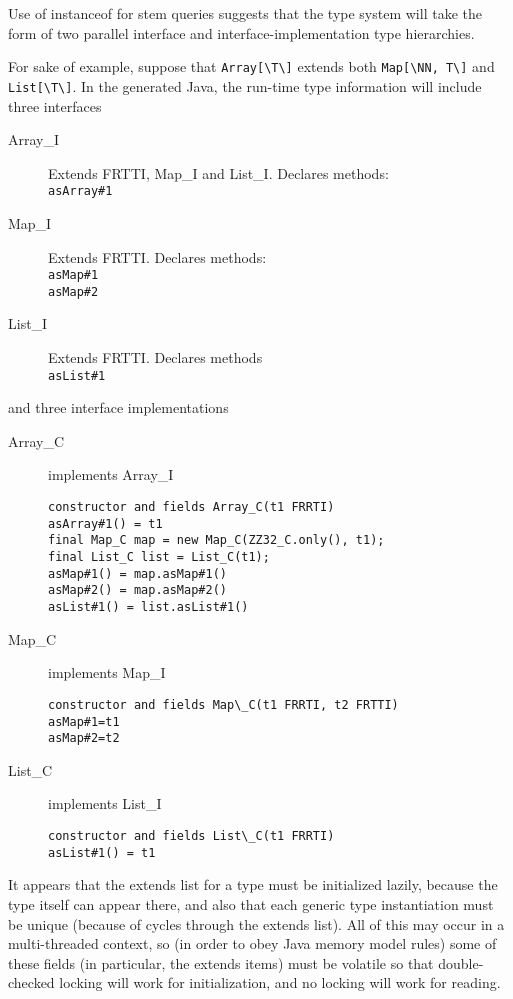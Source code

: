 \documentclass[11pt]{article}
\begin{document}
Use of instanceof for stem queries suggests that the type system will take the form of two parallel interface and interface-implementation type hierarchies.

For sake of example, suppose that \verb+Array[\T\]+ extends both \verb+Map[\NN, T\]+ and \verb+List[\T\]+.  In the generated Java, the run-time type information will include three interfaces
\begin{description}
\item[Array\_I] Extends FRTTI, Map\_I and List\_I. Declares methods:\\
\verb+asArray#1+
\item[Map\_I] Extends FRTTI.  Declares methods:\\
\verb+asMap#1+\\
\verb+asMap#2+
\item[List\_I] Extends FRTTI.  Declares methods\\
\verb+asList#1+
\end{description}

and three interface implementations
\begin{description}
\item[Array\_C] implements Array\_I
\begin{verbatim}
constructor and fields Array_C(t1 FRRTI)
asArray#1() = t1
final Map_C map = new Map_C(ZZ32_C.only(), t1);
final List_C list = List_C(t1);
asMap#1() = map.asMap#1()
asMap#2() = map.asMap#2()
asList#1() = list.asList#1()
\end{verbatim}
\item[Map\_C] implements Map\_I
\begin{verbatim}
constructor and fields Map\_C(t1 FRRTI, t2 FRTTI)
asMap#1=t1
asMap#2=t2
\end{verbatim}
\item[List\_C] implements List\_I
\begin{verbatim}
constructor and fields List\_C(t1 FRRTI)
asList#1() = t1
\end{verbatim}
\end{description}

It appears that the extends list for a type must be initialized lazily, because the type itself can appear there, and also that each generic type instantiation must be unique (because of cycles through the extends list).  All of this may occur in a multi-threaded context, so (in order to obey Java memory model rules) some of these fields (in particular, the extends items) must be volatile so that double-checked locking will work for initialization, and no locking will work for reading.
\end{document}
